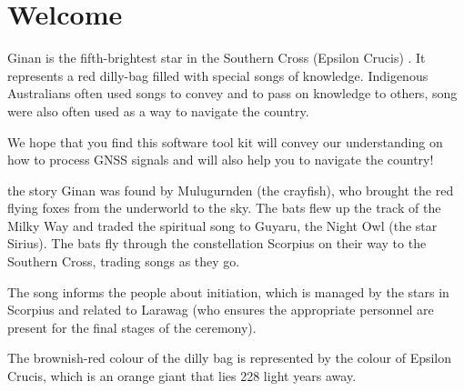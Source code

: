 \chapter{Welcome}
\label{ch:Ginan}


Ginan is the fifth-brightest star in the Southern Cross (Epsilon Crucis) . It represents a red dilly-bag filled with special songs of knowledge.
Indigenous Australians often used songs to convey and to pass on knowledge to others, song were also often used as a way to navigate the country.

We hope that you find this software tool kit will convey our understanding on how to process GNSS signals and will also help you to navigate the country!

the story Ginan was found by Mulugurnden (the crayfish), who brought the red flying foxes from the underworld to the sky. The bats flew up the track of the Milky Way and traded the spiritual song to Guyaru, the Night Owl (the star Sirius). The bats fly through the constellation Scorpius on their way to the Southern Cross, trading songs as they go.

The song informs the people about initiation, which is managed by the stars in Scorpius and related to Larawag (who ensures the appropriate personnel are present for the final stages of the ceremony).

The brownish-red colour of the dilly bag is represented by the colour of Epsilon Crucis, which is an orange giant that lies 228 light years away.